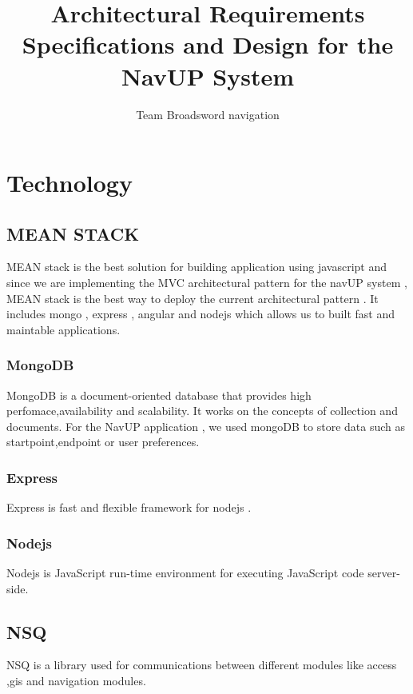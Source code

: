 \documentclass[11pt]{article}
\author{Team Broadsword navigation}
\title{Architectural Requirements Specifications and Design for the NavUP System}
\begin{document}
	\setlength{\parskip}{6pt}
	

	
	\tableofcontents
	
	\newpage

\section{Technology}
\subsection{MEAN STACK}  
	MEAN stack is the best solution for building application using javascript and since we are implementing the MVC architectural pattern for the navUP system , MEAN stack is the best way to deploy the current architectural pattern . It includes mongo , express , angular and nodejs which allows us to built fast and maintable applications.
\subsubsection{MongoDB}	
MongoDB is a document-oriented database that provides high perfomace,availability and scalability. It works on the concepts of collection and documents. For the NavUP application , we used mongoDB to store data such as startpoint,endpoint or user preferences.
\subsubsection{Express}
Express is fast and flexible framework for nodejs . 
\subsubsection{Nodejs}	
 Nodejs is JavaScript run-time environment for executing JavaScript code server-side. 
 \subsection{NSQ} 
NSQ is a library used for communications between different modules like access ,gis and navigation modules. 
\end{document}
